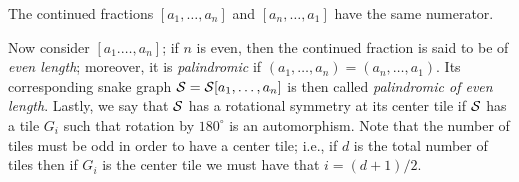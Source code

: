 \begin{corollary}
    The continued fractions $[a_1,\dots,a_n]$ and $[a_n,\dots,a_1]$ have the same numerator.
\end{corollary}
Now consider $[a_1.\dots,a_n]$; if $n$ is even, then the continued fraction is said to be of \emph{even length}; moreover, it is \emph{palindromic} if $(a_1,\dots,a_n) = (a_n , \dots, a_1)$. Its corresponding snake graph $\mathcal{S}=\mathcal{S}[a_1,\dots,a_n]$ is then called \emph{palindromic of even length}. Lastly, we say that $\mathcal{S}$ has a rotational symmetry at its center tile if $\mathcal{S}$ has a tile $G_i$ such that rotation by $180^{\circ}$ is an automorphism. Note that the number of tiles must be odd in order to have a center tile; i.e., if $d$ is the total number of tiles then  if $G_i$ is the center tile we must have that $i = (d+1)/2$.


